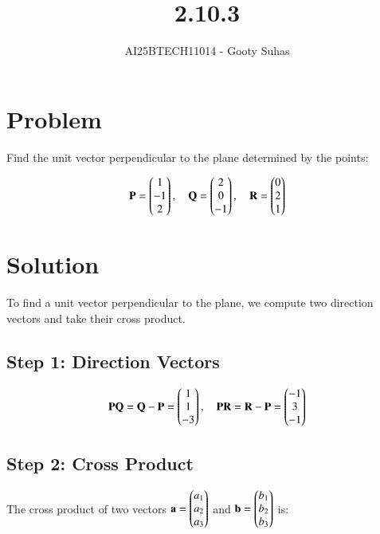 \documentclass[journal]{IEEEtran}
\begin{document}

\vspace{3cm}

\title{2.10.3}
\author{AI25BTECH11014 - Gooty Suhas}
{\let\newpage\relax\maketitle}

\renewcommand{\thefigure}{\theenumi}
\renewcommand{\thetable}{\theenumi}
\setlength{\intextsep}{10pt}
\renewcommand{\thetable}{\theenumi}

\section*{\large\textbf{Problem}}
\vspace{0.5cm}

Find the unit vector perpendicular to the plane determined by the points:


\[
\mathbf{P} = \begin{pmatrix}1 \\ -1 \\ 2\end{pmatrix}, \quad
\mathbf{Q} = \begin{pmatrix}2 \\ 0 \\ -1\end{pmatrix}, \quad
\mathbf{R} = \begin{pmatrix}0 \\ 2 \\ 1\end{pmatrix}
\]



\section*{\large\textbf{Solution}}
\vspace{0.5cm}

To find a unit vector perpendicular to the plane, we compute two direction vectors and take their cross product.

\subsection*{Step 1: Direction Vectors}


\[
\mathbf{PQ} = \mathbf{Q} - \mathbf{P} = \begin{pmatrix}1 \\ 1 \\ -3\end{pmatrix}, \quad
\mathbf{PR} = \mathbf{R} - \mathbf{P} = \begin{pmatrix}-1 \\ 3 \\ -1\end{pmatrix}
\]



\subsection*{Step 2: Cross Product}
The cross product of two vectors \( \mathbf{a} = \begin{pmatrix}a_1 \\ a_2 \\ a_3\end{pmatrix} \) and \( \mathbf{b} = \begin{pmatrix}b_1 \\ b_2 \\ b_3\end{pmatrix} \) is:
\end{document}
